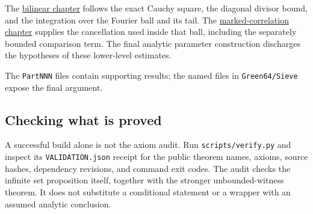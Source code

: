 The \protect\hyperlink{bilinear}{bilinear chapter} follows the exact
Cauchy square, the diagonal divisor bound, and the integration over the
Fourier ball and its tail. The
\protect\hyperlink{marked-correlation}{marked-correlation chapter}
supplies the cancellation used inside that ball, including the
separately bounded comparison term. The final analytic parameter
construction discharges the hypotheses of these lower-level estimates.

The {\small\nolinkurl{PartNNN}} files contain supporting results; the
named files in {\small\nolinkurl{Green64/Sieve}} expose the final
argument.


\hypertarget{lean-guide-checking-what-is-proved}{%
\subsection{Checking what is
proved}\label{lean-guide-checking-what-is-proved}}

A successful build alone is not the axiom audit. Run
{\small\nolinkurl{scripts/verify.py}} and inspect its
{\small\nolinkurl{VALIDATION.json}} receipt for the public theorem
names, axioms, source hashes, dependency revisions, and command exit
codes. The audit checks the infinite set proposition itself, together
with the stronger unbounded-witness theorem. It does not substitute a
conditional statement or a wrapper with an assumed analytic conclusion.

